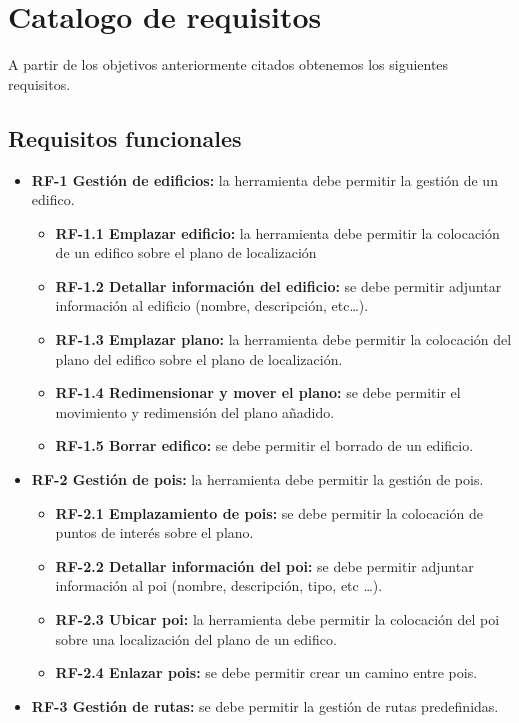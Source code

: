 \section{Catalogo de requisitos}
A partir de los objetivos anteriormente citados obtenemos los siguientes requisitos.

\subsection{Requisitos funcionales}

\begin{itemize}
\item
\textbf{RF-1 Gestión de edificios:} la herramienta debe permitir la gestión de un edifico.
\begin{itemize}
	\item
	\textbf{RF-1.1 Emplazar edificio:} la herramienta debe permitir la colocación de un edifico sobre el plano de localización
	\item
	\textbf{RF-1.2 Detallar información del edificio:} se debe permitir adjuntar información al edificio (nombre, descripción, etc\ldots).
	\item
	\textbf{RF-1.3 Emplazar plano:} la herramienta debe permitir la colocación del plano del edifico sobre el plano de localización.
	\item
	\textbf{RF-1.4 Redimensionar y mover el plano:} se debe permitir el movimiento y redimensión del plano añadido.
	\item
	\textbf{RF-1.5 Borrar edifico:} se debe permitir el borrado de un edificio.
\end{itemize}
\item
\textbf{RF-2 Gestión de pois:} la herramienta debe permitir la gestión de pois.
\begin{itemize}
	\item
	\textbf{RF-2.1 Emplazamiento de pois:} se debe permitir la colocación de puntos de interés sobre el plano.
	\item
	\textbf{RF-2.2 Detallar información del poi:} se debe permitir adjuntar información al poi (nombre, descripción, tipo, etc			\ldots).
	\item
	\textbf{RF-2.3 Ubicar poi:} la herramienta debe permitir la colocación del poi sobre una localización del plano de un edifico.
	\item
	\textbf{RF-2.4 Enlazar pois:} se debe permitir crear un camino entre pois.
\end{itemize}
\item
\textbf{RF-3 Gestión de rutas:} se debe permitir la gestión de rutas predefinidas.

\end{itemize}
